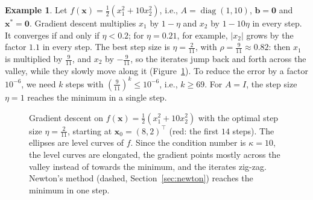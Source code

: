\documentclass[11pt]{article}
\theoremstyle{definition}
\newtheorem{example}[definition]{Example}
\theoremstyle{plain}
\theoremstyle{remark}
\DeclareMathOperator{\diag}{diag}
\begin{document}
\begin{example}\label{ex:gd-quadratic}
    Let $f(\mathbf{x}) = \frac{1}{2}(x_1^2 + 10x_2^2)$, i.e., $A = \diag(1, 10)$, $\mathbf{b} = \mathbf{0}$ and $\mathbf{x}^* = \mathbf{0}$. Gradient descent multiplies $x_1$ by $1 - \eta$ and $x_2$ by $1 - 10\eta$ in every step. It converges if and only if $\eta < 0.2$; for $\eta = 0.21$, for example, $|x_2|$ grows by the factor $1.1$ in every step. The best step size is $\eta = \frac{2}{11}$, with $\rho = \frac{9}{11} \approx 0.82$: then $x_1$ is multiplied by $\frac{9}{11}$, and $x_2$ by $-\frac{9}{11}$, so the iterates jump back and forth across the valley, while they slowly move along it (Figure~\ref{fig:gd}). To reduce the error by a factor $10^{-6}$, we need $k$ steps with $(\frac{9}{11})^k \leq 10^{-6}$, i.e., $k \geq 69$. For $A = I$, the step size $\eta = 1$ reaches the minimum in a single step.
\end{example}

\begin{figure}[ht]
    \centering
    \caption{Gradient descent on $f(\mathbf{x}) = \frac{1}{2}(x_1^2 + 10x_2^2)$ with the optimal step size $\eta = \frac{2}{11}$, starting at $\mathbf{x}_0 = (8, 2)^\top$ (red: the first $14$ steps). The ellipses are level curves of $f$. Since the condition number is $\kappa = 10$, the level curves are elongated, the gradient points mostly across the valley instead of towards the minimum, and the iterates zig-zag. Newton's method (dashed, Section~\ref{sec:newton}) reaches the minimum in one step.}
    \label{fig:gd}
\end{figure}
\end{document}
